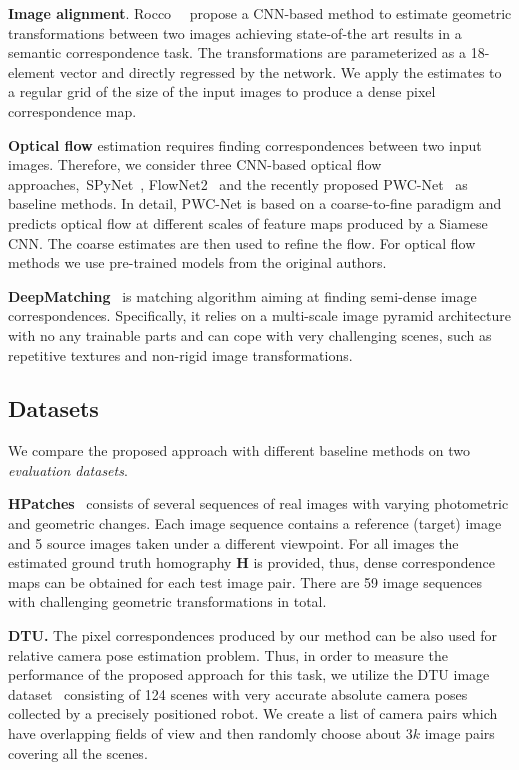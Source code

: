 \documentclass[10pt,twocolumn,letterpaper]{article}
\begin{document}
\noindent\textbf{Image alignment}. Rocco~\etal~\cite{Rocco17} propose a CNN-based method to estimate geometric transformations between two images achieving state-of-the art results in a semantic correspondence task. The transformations are parameterized as a 18-element vector and directly regressed by the network. We apply the estimates to a regular grid of the size of the input images to produce a dense pixel correspondence map.

\noindent\textbf{Optical flow} estimation requires finding correspondences between two input images. Therefore, we consider three CNN-based optical flow approaches,~\ie SPyNet~\cite{Spynet}, FlowNet2~\cite{FlowNet2} and the recently proposed PWC-Net~\cite{PWC-Net} as baseline methods. In detail, PWC-Net is based on a coarse-to-fine paradigm and predicts optical flow at different scales of feature maps produced by a Siamese CNN. The coarse estimates are then used to refine the flow. For optical flow methods we use pre-trained models from the original authors.

\noindent\textbf{DeepMatching}~\cite{DeepMatching} is matching algorithm aiming at finding semi-dense image correspondences. Specifically, it relies on a multi-scale image pyramid architecture with no any trainable parts and can cope with very challenging scenes, such as repetitive textures and non-rigid image transformations.

\vspace{-2mm}
\subsection{Datasets}\label{ssec:datasets}
\vspace{-1mm}
We compare the proposed approach with different baseline methods on two \textit{evaluation datasets}.

\noindent\textbf{HPatches}~\cite{HPatches} consists of several sequences of real images with varying photometric and geometric changes. Each image sequence contains a reference (target) image and 5 source images taken under a different viewpoint. For all images the estimated ground truth homography $\mathbf{H}$ is provided, thus, dense correspondence maps can be obtained for each test image pair. There are 59 image sequences with challenging geometric transformations in total. 

\noindent\textbf{DTU.} The pixel correspondences produced by our method can be also used for relative camera pose estimation problem. Thus, in order to measure the performance of the proposed approach for this task, we utilize the DTU image dataset~\cite{DTU} consisting of 124 scenes with very accurate absolute camera poses collected by a precisely positioned robot. We create a list of camera pairs which have overlapping fields of view and then randomly choose about $3k$ image pairs covering all the scenes.
\end{document}
